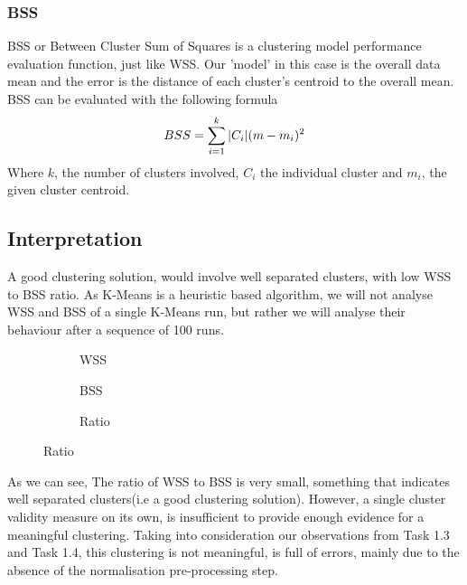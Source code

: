 \documentclass[12pt]{article}
\begin{document}
	 			\subsubsection*{BSS}
		 			BSS or  Between Cluster Sum of Squares is a clustering model performance evaluation function, just like WSS. Our 'model' in this case is the overall data mean and the error is the distance of each cluster's centroid to the overall mean. BSS can be evaluated with the following formula\cite{???}
		 			\begin{align}
		 				BSS = \sum_{i=1}^{k}{\abs{C_i}(m-m_i)^2}
		 			\end{align}
		 			Where $k$, the number of clusters involved, $C_i$ the individual cluster and $m_i$, the given cluster centroid.
		 		\subsection{Interpretation}
		 			A good clustering solution, would involve well separated clusters, with low WSS to BSS ratio\cite{???}. As K-Means is a heuristic based algorithm, we will not analyse WSS and BSS of a single K-Means run, but rather we will analyse their behaviour after a sequence of 100 runs. 
		 			\begin{figure}[H]
		 				\centering
		 				\begin{subfigure}{0.4\textwidth}
		 					\caption{WSS}
		 					\label{fig:first}
		 				\end{subfigure}
		 				\hfill
		 				\begin{subfigure}{0.4\textwidth}
		 					\caption{BSS}
		 					\label{fig:second}
		 				\end{subfigure}
		 				\hfill
		 				\begin{subfigure}{0.4\textwidth}
		 					\caption{Ratio}
		 					\label{fig:third}
		 				\end{subfigure}
		 				\label{fig:figures}
		 			\end{figure}
	 				As we can see, The ratio of WSS to BSS is very small, something that indicates well separated clusters(i.e a good clustering solution). However, a single cluster validity measure on its own, is insufficient to provide enough evidence for a meaningful clustering. Taking into consideration our observations from Task 1.3 and Task 1.4, this clustering \cite{???}is not meaningful, is full of
	 				errors, mainly due to the absence of the normalisation pre-processing step.
	 				
\end{document}
